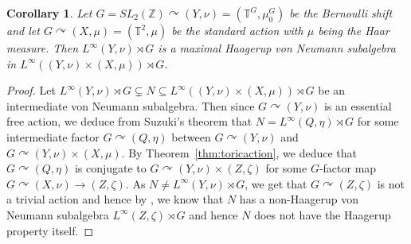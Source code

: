 \documentclass[12pt]{amsart}
\newtheorem{cor}[thm]{Corollary}
\theoremstyle{definition}
\begin{document}
\begin{cor}
Let $G=SL_2(\mathbb{Z})\curvearrowright (Y,\nu)=(\mathbb{T}^{G},\mu_0^G)$ be the Bernoulli shift and let $G\curvearrowright (X,\mu)=(\mathbb{T}^2, \mu)$ be the standard action with $\mu$ being the Haar measure. Then $L^{\infty}(Y,\nu)\rtimes G$ is a maximal Haagerup von Neumann subalgebra in $L^{\infty}((Y,\nu)\times (X,\mu))\rtimes G$.
\end{cor}
\begin{proof}
Let $L^{\infty}(Y,\nu)\rtimes G\subsetneq N\subseteq L^{\infty}((Y,\nu)\times (X,\mu))\rtimes G$ be an intermediate von Neumann subalgebra. Then since $G\curvearrowright (Y,\nu)$ is an essential free action, we deduce from Suzuki's theorem \cite{suzuki} that $N=L^{\infty}(Q,\eta)\rtimes G$ for some intermediate factor $G\curvearrowright (Q,\eta)$ between $G\curvearrowright (Y,\nu)$ and $G\curvearrowright (Y,\nu)\times (X,\mu)$. By Theorem~\ref{thm:toricaction}, we deduce that $G\curvearrowright (Q,\eta)$ is conjugate to $G\curvearrowright (Y,\nu)\times (Z,\zeta)$ for some $G$-factor map $G\curvearrowright (X,\nu)\rightarrow (Z,\zeta)$. As $N\neq L^{\infty}(Y,\nu)\rtimes G$, we get that $G\curvearrowright (Z,\zeta)$ is not a trivial action and hence by \cite[lemma 3.5]{jiangskalski}, we know that $N$ has a non-Haagerup von Neumann subalgebra $L^{\infty}(Z,\zeta)\rtimes G$ and hence $N$ does not have the Haagerup property itself.  
\end{proof}
\newpage

\end{document}
